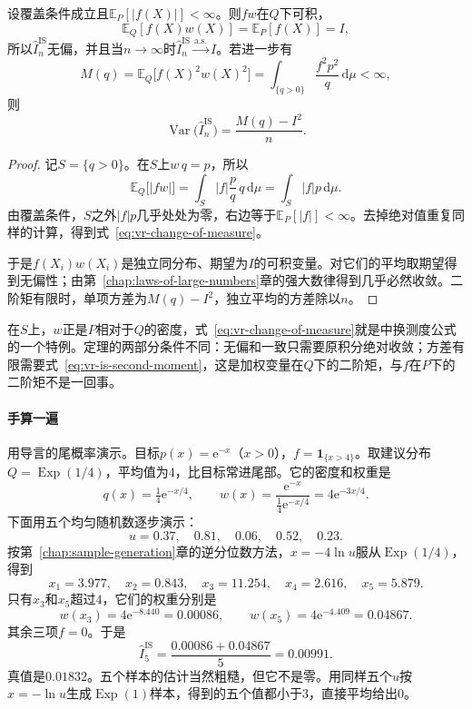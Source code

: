 \begin{theorem}[换测度恒等式]
\label{thm:vr-change-of-measure}
设覆盖条件成立且$\mathbb{E}_P[\lvert f(X)\rvert]<\infty$。则$f w$在$Q$下可积，
\begin{equation}
 \mathbb{E}_Q[f(X)w(X)]=\mathbb{E}_P[f(X)]=I ,
 \label{eq:vr-change-of-measure}
\end{equation}
所以$\hat{I}_n^{\mathrm{IS}}$无偏，并且当$n\to\infty$时$\hat{I}_n^{\mathrm{IS}}\xrightarrow{\mathrm{a.s.}}I$。若进一步有
\begin{equation}
 M(q)=\mathbb{E}_Q\bigl[f(X)^2w(X)^2\bigr]=\int_{\{q>0\}}\frac{f^2p^2}{q}\,\mathrm{d}\mu<\infty ,
 \label{eq:vr-is-second-moment}
\end{equation}
则
\begin{equation}
 \operatorname{Var}\bigl(\hat{I}_n^{\mathrm{IS}}\bigr)=\frac{M(q)-I^2}{n} .
 \label{eq:vr-is-variance}
\end{equation}
\end{theorem}

\begin{proof}
记$S=\{q>0\}$。在$S$上$w\,q=p$，所以
\[
 \mathbb{E}_Q\bigl[\lvert f w\rvert\bigr]=\int_S\lvert f\rvert\frac{p}{q}\,q\,\mathrm{d}\mu=\int_S\lvert f\rvert p\,\mathrm{d}\mu .
\]
由覆盖条件，$S$之外$\lvert f\rvert p$几乎处处为零，右边等于$\mathbb{E}_P[\lvert f\rvert]<\infty$。去掉绝对值重复同样的计算，得到式~\eqref{eq:vr-change-of-measure}。

于是$f(X_i)w(X_i)$是独立同分布、期望为$I$的可积变量。对它们的平均取期望得到无偏性；由第~\ref{chap:laws-of-large-numbers}章的强大数律得到几乎必然收敛。二阶矩有限时，单项方差为$M(q)-I^2$，独立平均的方差除以$n$。
\end{proof}

在$S$上，$w$正是$P$相对于$Q$的密度，式~\eqref{eq:vr-change-of-measure}就是中换测度公式的一个特例。定理的两部分条件不同：无偏和一致只需要原积分绝对收敛；方差有限需要式~\eqref{eq:vr-is-second-moment}，这是加权变量在$Q$下的二阶矩，与$f$在$P$下的二阶矩不是一回事。

\paragraph{手算一遍}
用导言的尾概率演示。目标$p(x)=\mathrm{e}^{-x}$（$x>0$），$f=\mathbf{1}_{\{x>4\}}$。取建议分布$Q=\operatorname{Exp}(1/4)$，平均值为$4$，比目标常进尾部。它的密度和权重是
\[
 q(x)=\tfrac14\mathrm{e}^{-x/4},\qquad w(x)=\frac{\mathrm{e}^{-x}}{\tfrac14\mathrm{e}^{-x/4}}=4\mathrm{e}^{-3x/4} .
\]
下面用五个均匀随机数逐步演示：
\[
 u=0.37,\quad 0.81,\quad 0.06,\quad 0.52,\quad 0.23 .
\]
按第~\ref{chap:sample-generation}章的逆分位数方法，$x=-4\ln u$服从$\operatorname{Exp}(1/4)$，得到
\[
 x_1=3.977,\quad x_2=0.843,\quad x_3=11.254,\quad x_4=2.616,\quad x_5=5.879 .
\]
只有$x_3$和$x_5$超过$4$，它们的权重分别是
\[
 w(x_3)=4\mathrm{e}^{-8.440}=0.00086,\qquad w(x_5)=4\mathrm{e}^{-4.409}=0.04867 .
\]
其余三项$f=0$。于是
\[
 \hat{I}_5^{\mathrm{IS}}=\frac{0.00086+0.04867}{5}=0.00991 .
\]
真值是$0.01832$。五个样本的估计当然粗糙，但它不是零。用同样五个$u$按$x=-\ln u$生成$\operatorname{Exp}(1)$样本，得到的五个值都小于$3$，直接平均给出$0$。


